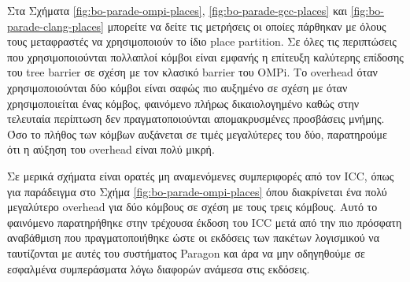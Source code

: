 Στα Σχήματα \ref{fig:bo-parade-ompi-places}, \ref{fig:bo-parade-gcc-places} και \ref{fig:bo-parade-clang-places} μπορείτε να δείτε τις μετρήσεις οι οποίες πάρθηκαν με όλους τους μεταφραστές να χρησιμοποιούν το ίδιο place partition. Σε όλες τις περιπτώσεις που χρησιμοποιούνται πολλαπλοί κόμβοι είναι εμφανής η επίτευξη καλύτερης επίδοσης του tree barrier σε σχέση με τον κλασικό barrier του OMPi. Το overhead όταν χρησιμοποιούνται δύο κόμβοι είναι σαφώς πιο αυξημένο σε σχέση με όταν χρησιμοποιείται ένας κόμβος, φαινόμενο πλήρως δικαιολογημένο καθώς στην τελευταία περίπτωση δεν πραγματοποιούνται απομακρυσμένες προσβάσεις μνήμης. Όσο το πλήθος των κόμβων αυξάνεται σε τιμές μεγαλύτερες του δύο, παρατηρούμε ότι η αύξηση του overhead είναι πολύ μικρή. %

Σε μερικά σχήματα είναι ορατές μη αναμενόμενες συμπεριφορές από τον ICC, όπως για παράδειγμα στο Σχήμα \ref{fig:bo-parade-ompi-places} όπου διακρίνεται ένα πολύ μεγαλύτερο overhead για δύο κόμβους σε σχέση με τους τρεις κόμβους. Αυτό το φαινόμενο παρατηρήθηκε στην τρέχουσα έκδοση του ICC μετά από την πιο πρόσφατη αναβάθμιση που πραγματοποιήθηκε ώστε οι εκδόσεις των πακέτων λογισμικού να ταυτίζονται με αυτές του συστήματος Paragon και άρα να μην οδηγηθούμε σε εσφαλμένα συμπεράσματα λόγω διαφορών ανάμεσα στις εκδόσεις.

